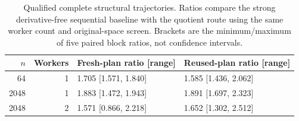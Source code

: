 \begin{table}[t]\centering
\caption{Qualified complete structural trajectories. Ratios compare the strong derivative-free sequential baseline with the quotient route using the same worker count and original-space screen. Brackets are the minimum/maximum of five paired block ratios, not confidence intervals.}
\begin{tabular}{rrll}\toprule
$n$ & Workers & Fresh-plan ratio [range] & Reused-plan ratio [range]\\\midrule
64&1&1.705 [1.571, 1.840]&1.585 [1.436, 2.062]\\
2048&1&1.883 [1.472, 1.943]&1.891 [1.697, 2.323]\\
2048&2&1.571 [0.866, 2.218]&1.652 [1.302, 2.512]\\
\bottomrule\end{tabular}\label{tab:structural-time}\end{table}
